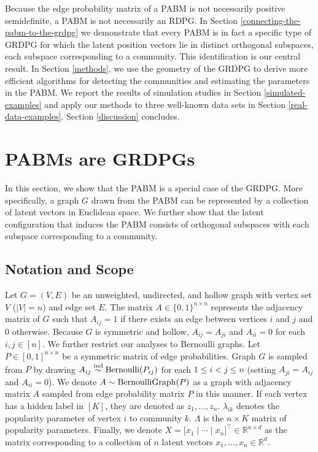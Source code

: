 \documentclass[12pt]{article}
\begin{document}
Because the edge probability matrix of a PABM is not necessarily
positive semidefinite, a PABM is not necessarily an RDPG.  In Section
\ref{connecting-the-pabm-to-the-grdpg} we demonstrate that every PABM
is in fact a specific type of GRDPG for which the latent position
vectors lie in distinct orthogonal subspaces, each subspace
corresponding to a community.  This identification is our central
result.  In Section \ref{methods}, we use the geometry of the GRDPG to
derive more efficient algorithms for detecting the communities and
estimating the parameters in the PABM.  We report the results of
simulation studies in Section \ref{simulated-examples} and apply our
methods to three well-known data sets in Section
\ref{real-data-examples}. Section \ref{discussion} concludes.

\hypertarget{connecting-the-popularity-adjusted-block-model-to-the-generalized-random-dot-product-graph}{%
\section{PABMs are GRDPGs}\label{connecting-the-popularity-adjusted-block-model-to-the-generalized-random-dot-product-graph}}

In this section, we show that the PABM is a special case of the GRDPG. 
More specifically, a graph $G$ drawn from the PABM can be represented by 
a collection of latent vectors in Euclidean space. 
We further show that the latent configuration that
induces the PABM consists of orthogonal subspaces with each subspace
corresponding to a community.

\hypertarget{notation}{%
\subsection{Notation and Scope}\label{notation}}

Let $G = (V, E)$ be an unweighted, undirected, 
and hollow graph with vertex set $V$ ($|V| = n$) and edge set $E$. The matrix
$A \in \{0, 1\}^{n \times n}$ represents the adjacency matrix of $G$ 
such that $A_{ij} = 1$ if there exists an edge between vertices $i$ and $j$ 
and $0$ otherwise. Because $G$ is symmetric and hollow,
$A_{ij} = A_{ji}$ and $A_{ii} = 0$ for each $i, j \in [n]$. 
We further restrict our analyses to Bernoulli graphs. 
Let $P \in [0, 1]^{n \times n}$ be a symmetric matrix of edge probabilities. 
Graph $G$ is sampled from $P$ by drawing $A_{ij} \stackrel{\mathrm{ind}}{\sim} \mathrm{Bernoulli}(P_{ij})$ 
for each $1 \leq i < j \leq n$ (setting $A_{ji} = A_{ij}$ and $A_{ii} = 0$). 
We denote $A \sim \mathrm{BernoulliGraph}(P)$ as a graph with adjacency matrix $A$ 
sampled from edge probability matrix $P$ in this manner. 
If each vertex has a hidden label in $[K]$, 
they are denoted as $z_1, ..., z_n$. 
$\lambda_{ik}$ denotes the popularity parameter of vertex $i$ to community $k$. 
$\Lambda$ is the $n \times K$ matrix of popularity parameters. 
Finally, we denote 
$X = \bigl[x_1 \mid \cdots \mid x_n\bigr]^\top \in \mathbb{R}^{n \times d}$ 
as the matrix corresponding to a collection of $n$ latent vectors $x_1, ..., x_n \in \mathbb{R}^d$.
\end{document}
